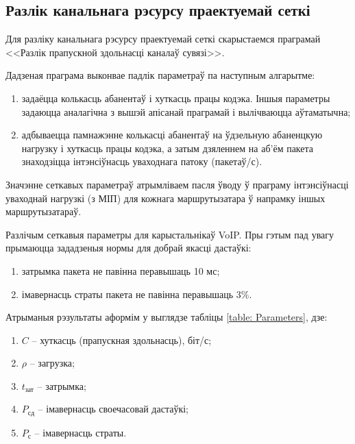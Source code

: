 \subsection{Разлік канальнага рэсурсу праектуемай сеткі}

Для разліку канальнага рэсурсу праектуемай сеткі скарыстаемся
праграмай <<Разлік прапускной здольнасці каналаў сувязі>>.

Дадзеная праграма выконвае падлік параметраў па наступным
алгарытме:
\begin{enumerate}
    \item задаёцца колькасць абанентаў і хуткасць працы кодэка.
          Іншыя параметры задаюцца аналагічна з вышэй апісанай
          праграмай і вылічваюцца аўтаматычна;
    \item адбываецца памнажэнне колькасці абанентаў на ўдзельную
          абаненцкую нагрузку і хуткасць працы кодэка, а затым
          дзяленнем на аб'ём пакета знаходзіцца інтэнсіўнасць
          уваходнага патоку (пакетаў/с).
\end{enumerate}

Значэнне сеткавых параметраў атрымліваем пасля ўводу ў праграму
інтэнсіўнасці уваходнай нагрузкі (з МІП) для кожнага маршрутызатара
ў напрамку іншых маршрутызатараў.

Разлічым сеткавыя параметры для карыстальнікаў VoIP. Пры гэтым пад
увагу прымаюцца зададзеныя нормы для добрай якасці дастаўкі:
\begin{enumerate}
    \item затрымка пакета не павінна перавышаць 10 мс;
    \item імавернасць страты пакета не павінна перавышаць 3\%.
\end{enumerate}

Атрыманыя рэзультаты аформім у выглядзе табліцы
\ref{table: Parameters}, дзе:
\begin{enumerate}
    \item $C$ -- хуткасць (прапускная здольнасць), біт/с;
    \item $\rho$ -- загрузка;
    \item $t_{\text{зат}}$ -- затрымка;
    \item $P_{\text{сд}}$ -- імавернасць своечасовай дастаўкі;
    \item $P_{\text{с}}$ -- імавернасць страты.
\end{enumerate}

